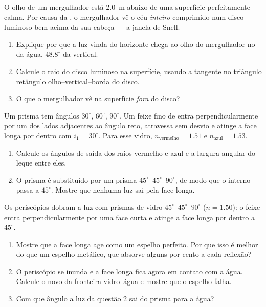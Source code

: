 \begin{exercise}[$\star\star\star$]\label{exo:g10:refraction:12}
O olho de um mergulhador está \qty{2.0}{m} abaixo de uma superfície
perfeitamente calma. Por causa da , o mergulhador vê o céu
\emph{inteiro} comprimido num disco luminoso bem acima da sua cabeça ---
a janela de Snell.
\begin{enumerate}
  \item Explique por que a luz vinda do horizonte chega ao olho do
        mergulhador no  da água, $48.8^\circ$ da vertical.
  \item Calcule o raio do disco luminoso na superfície, usando a tangente
        no triângulo retângulo olho--vertical--borda do disco.
  \item O que o mergulhador vê na superfície \emph{fora} do disco?
\end{enumerate}
\end{exercise}

\begin{exercise}[$\star\star\star$]\label{exo:g10:refraction:13}
Um prisma tem ângulos $30^\circ$, $60^\circ$, $90^\circ$. Um feixe fino
de  entra perpendicularmente por um dos lados adjacentes ao
ângulo reto, atravessa sem desvio e atinge a face longa por dentro com
$i_1 = 30^\circ$. Para esse vidro, $n_{\text{vermelho}} = 1.51$ e
$n_{\text{azul}} = 1.53$.
\begin{enumerate}
  \item Calcule os ângulos de saída dos raios vermelho e azul e a largura
        angular do leque entre eles.
  \item O prisma é substituído por um prisma
        $45^\circ$--$45^\circ$--$90^\circ$, de modo que o  interno passa a $45^\circ$. Mostre que nenhuma luz sai
        pela face longa.
\end{enumerate}
\end{exercise}

\begin{exercise}[$\star\star\star$]\label{exo:g10:refraction:14}
Os periscópios dobram a luz com prismas de vidro
$45^\circ$--$45^\circ$--$90^\circ$ ($n = 1.50$): o feixe entra
perpendicularmente por uma face curta e atinge a face longa por dentro a
$45^\circ$.
\begin{enumerate}
  \item Mostre que a face longa age como um espelho perfeito. Por que
        isso é melhor do que um espelho metálico, que absorve alguns por
        cento a cada reflexão?
  \item O periscópio se inunda e a face longa fica agora em contato com a
        água. Calcule o novo  da fronteira vidro--água e
        mostre que o espelho falha.
  \item Com que ângulo a luz da questão 2 sai do prisma para a água?
\end{enumerate}
\end{exercise}

